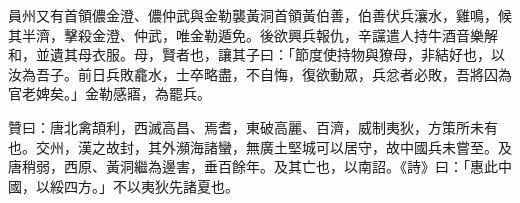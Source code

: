 \begin{pinyinscope}
 員州又有首領儂金澄、儂仲武與金勒襲黃洞首領黃伯善，伯善伏兵瀼水，雞鳴，候其半濟，擊殺金澄、仲武，唯金勒遁免。後欲興兵報仇，辛讜遣人持牛酒音樂解和，並遺其母衣服。母，賢者也，讓其子曰：「節度使持物與獠母，非結好也，以汝為吾子。前日兵敗龕水，士卒略盡，不自悔，復欲動眾，兵忿者必敗，吾將囚為官老婢矣。」金勒感寤，為罷兵。



 贊曰：唐北禽頡利，西滅高昌、焉耆，東破高麗、百濟，威制夷狄，方策所未有也。交州，漢之故封，其外瀕海諸蠻，無廣土堅城可以居守，故中國兵未嘗至。及唐稍弱，西原、黃洞繼為邊害，垂百餘年。及其亡也，以南詔。《詩》曰：「惠此中國，以綏四方。」不以夷狄先諸夏也。



\end{pinyinscope}